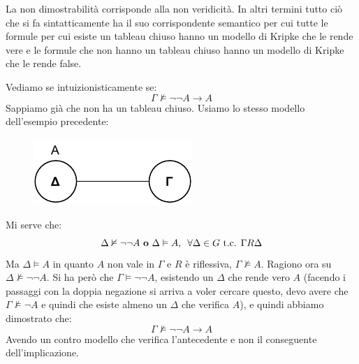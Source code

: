 \documentclass[a4paper,12pt, oneside]{book}
\begin{document}
\begin{teorema}
  La non dimostrabilità corrisponde alla non veridicità. In altri termini tutto
  ciò che si fa
  sintatticamente ha il suo corrispondente semantico per cui tutte le formule
  per cui esiste un tableau chiuso hanno un modello di Kripke che le rende vere
  e le formule che non hanno un tableau chiuso hanno un modello di Kripke che
  le rende false.
\end{teorema}
\begin{esempio}
  Vediamo se intuizionisticamente se:
  \[\Gamma\nvDash\neg\neg A\to A\]
  Sappiamo già che non ha un tableau chiuso. Usiamo lo stesso modello
  dell'esempio precedente:
  \begin{figure}[H]
    \centering
    \includegraphics[scale = 0.9]{img/k1.pdf}
  \end{figure}
  Mi serve che:
  \[\Delta\nvDash \neg\neg A\mbox{ \textbf{o} }\Delta\vDash A,\,\,\,\forall
    \Delta\in G \mbox{ t.c. } \Gamma R\Delta\]
  Ma $\Delta\vDash A$ in quanto $A$ non vale in $\Gamma$ e $R$ è
  riflessiva, $\Gamma\nvDash A$. Ragiono ora su $\Delta\nvDash \neg\neg A$. Si
  ha però che $\Gamma\vDash \neg\neg A$, esistendo un $\Delta$ che rende vero
  $A$ (facendo i passaggi con la doppia negazione si arriva a voler cercare
  questo, devo avere che $\Gamma\nvDash\neg A$ e quindi che esiste almeno un
  $\Delta$ che verifica $A$), e quindi abbiamo dimostrato che: 
  \[\Gamma\nvDash\neg\neg A\to A\]
  Avendo un contro modello che verifica l'antecedente e non il conseguente
  dell'implicazione. 
\end{esempio}
\end{document}
